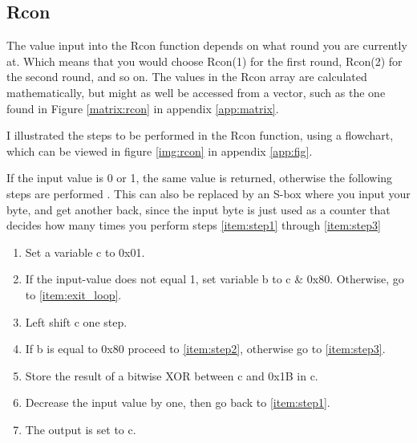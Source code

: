 \subsection{Rcon} \label{ch:Rcon}
The value input into the Rcon function depends on what round you are 
currently at. Which means that you would choose Rcon(1) for the first 
round, Rcon(2) for the second round, and so on. The values in the Rcon 
array are calculated mathematically, but might as well be accessed from 
a vector, such as the one found in Figure \ref{matrix:rcon} in 
appendix \ref{app:matrix}.

I illustrated the steps to be performed in the Rcon function, using a 
flowchart, which can be viewed in figure \ref{img:rcon} in appendix 
\ref{app:fig}.

If the input value is 0 or 1, the same value is returned, otherwise the 
following steps are performed \citep{RijndaelKeySchedule}. This can 
also be replaced by an S-box where you input your byte, and get another 
back, since the input byte is just used as a counter that decides how 
many times you perform steps \ref{item:step1} through \ref{item:step3} 
\begin{enumerate}
\item Set a variable c to 0x01.
\item If the input-value does not equal 1, set variable b to c \& 0x80. 
  Otherwise, go to \ref{item:exit_loop}. 
  \label{item:step1}
\item Left shift c one step.
\item If b is equal to 0x80 proceed to \ref{item:step2}, otherwise go to
  \ref{item:step3}.
\item Store the result of a bitwise XOR between c and 0x1B in c.
  \label{item:step2}
\item Decrease the input value by one, then go back to  
  \ref{item:step1}.
  \label{item:step3}
\item The output is set to c.
  \label{item:exit_loop}
\end{enumerate}
